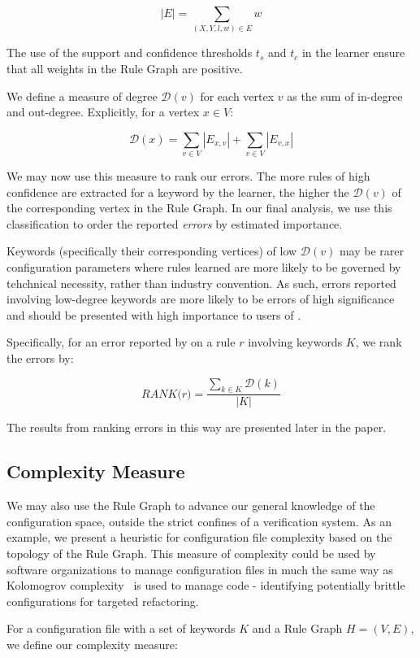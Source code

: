     $$|E| = \sum_{(X, Y, l, w) \in E} w$$

The use of the support and confidence thresholds $t_s$ and $t_c$ in the learner ensure 
that all weights in the Rule Graph are positive.

We define a measure of degree $\mathcal{D}(v)$ for each vertex $v$ as the sum of 
in-degree and out-degree. Explicitly, for a vertex $x \in V$:

    $$\mathcal{D}(x) = \sum_{v \in V} |E_{x, v}| + \sum_{v \in V} |E_{v, x}|$$

We may now use this measure to rank our errors.
The more rules of high confidence are extracted for a keyword by the learner, 
the higher the $\mathcal{D}(v)$ of the corresponding vertex in the Rule Graph.
In our final analysis, we use this classification to
order the reported {\it errors} by estimated importance.

Keywords (specifically their corresponding vertices)
of low $\mathcal{D}(v)$ may be rarer configuration
parameters where rules learned are more likely to be governed by 
tehchnical necessity, rather than industry convention. As such, errors
reported involving low-degree keywords are more likely to be errors
of high significance and should be presented with high importance
to users of \app.

Specifically, for an error reported by \app on a rule $r$ involving
keywords $K$, we rank the errors by:

    $$\textit{RANK(r)} = \frac{\sum_{k \in K} \mathcal{D}(k)}{|K|}$$

The results from ranking errors in this way are presented later in
the paper.

\subsection{Complexity Measure}

We may also use the Rule Graph to advance our general knowledge
of the configuration space, outside the strict confines of a
verification system. As an example, we present a heuristic
for configuration file complexity based on the topology of the
Rule Graph. This measure of complexity could be used by software
organizations to manage configuration files in much the same way
as Kolomogrov complexity~\cite{kolomogrov} is used to manage code - identifying
potentially brittle configurations for targeted refactoring.


For a configuration file with a set of keywords $K$
and a Rule Graph $H = (V, E)$, we define our complexity measure:

